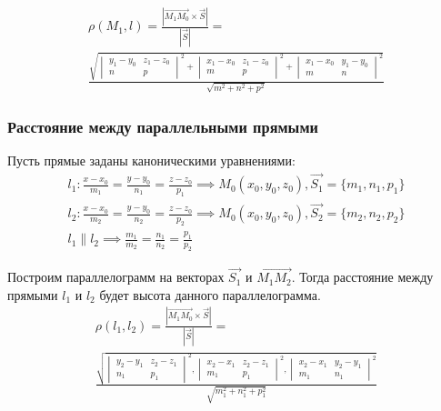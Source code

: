 \begin{gather*}
  \rho(M_1, l) = 
  \frac{|\overrightarrow{M_1M_0} \times \vec{S}|}{|\vec{S}|} = \\
  \boxed{\frac{\sqrt{
  \begin{vmatrix}
    y_1 - y_0 & z_1 - z_0 \\
    n & p
  \end{vmatrix}^2 +
  \begin{vmatrix}
    x_1 - x_0 & z_1 - z_0 \\
    m & p
  \end{vmatrix}^2 +
  \begin{vmatrix}
    x_1 - x_0 & y_1 - y_0 \\
    m & n
  \end{vmatrix}^2
  }}{\sqrt{m^2 + n^2 + p^2} }} 
\end{gather*}

\subsubsection{Расстояние между параллельными прямыми}

Пусть прямые заданы каноническими уравнениями:
\begin{gather*}
  l_1: \frac{x - x_0}{m_1} = \frac{y - y_0}{n_1} = \frac{z - z_0}{p_1} \implies M_0(x_0, y_0, z_0), \vec{S_1} = \{m_1, n_1, p_1\} \\
  l_2: \frac{x - x_0}{m_2} = \frac{y - y_0}{n_2} = \frac{z - z_0}{p_2} \implies M_0(x_0, y_0, z_0), \vec{S_2} = \{m_2, n_2, p_2\} \\
  l_1 \parallel l_2 \implies \frac{m_1}{m_2} = \frac{n_1}{n_2} = \frac{p_1}{p_2}
\end{gather*}

Построим параллелограмм на векторах $\overrightarrow{S_1}$ и $\overrightarrow{M_1M_2}$.
Тогда расстояние между прямыми $l_1$ и $l_2$ будет высота данного параллелограмма.
\begin{gather*}
  \rho(l_1, l_2) = \frac{|\overrightarrow{M_1M_0} \times \vec{S}|}{|\vec{S}|} = \\
  \boxed{\frac{\sqrt{
  \begin{vmatrix}
    y_2 - y_1 & z_2 - z_1 \\
    n_1 & p_1
  \end{vmatrix}^2,
  \begin{vmatrix}
    x_2 - x_1 & z_2 - z_1 \\
    m_1 & p_1
  \end{vmatrix}^2, 
  \begin{vmatrix}
    x_2 - x_1 & y_2 - y_1 \\
    m_1 & n_1
  \end{vmatrix}^2
}}{\sqrt{m_1^2 + n_1^2 + p_1^2} }}
\end{gather*}


